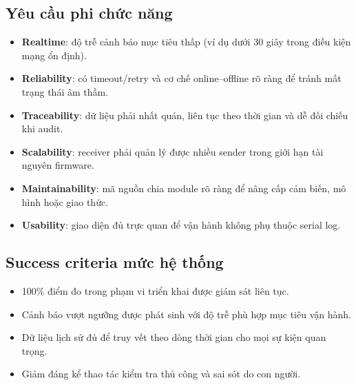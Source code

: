 \documentclass[12pt,a4paper]{report}
\begin{document}
\subsection{Yêu cầu phi chức năng}
\begin{itemize}[leftmargin=1.5em]
    \item \textbf{Realtime}: độ trễ cảnh báo mục tiêu thấp (ví dụ dưới 30 giây trong điều kiện mạng ổn định).
    \item \textbf{Reliability}: có timeout/retry và cơ chế online--offline rõ ràng để tránh mất trạng thái âm thầm.
    \item \textbf{Traceability}: dữ liệu phải nhất quán, liên tục theo thời gian và dễ đối chiếu khi audit.
    \item \textbf{Scalability}: receiver phải quản lý được nhiều sender trong giới hạn tài nguyên firmware.
    \item \textbf{Maintainability}: mã nguồn chia module rõ ràng để nâng cấp cảm biến, mô hình hoặc giao thức.
    \item \textbf{Usability}: giao diện đủ trực quan để vận hành không phụ thuộc serial log.
\end{itemize}

\subsection{Success criteria mức hệ thống}
\begin{itemize}[leftmargin=1.5em]
    \item 100\% điểm đo trong phạm vi triển khai được giám sát liên tục.
    \item Cảnh báo vượt ngưỡng được phát sinh với độ trễ phù hợp mục tiêu vận hành.
    \item Dữ liệu lịch sử đủ để truy vết theo dòng thời gian cho mọi sự kiện quan trọng.
    \item Giảm đáng kể thao tác kiểm tra thủ công và sai sót do con người.
\end{itemize}
\end{document}
